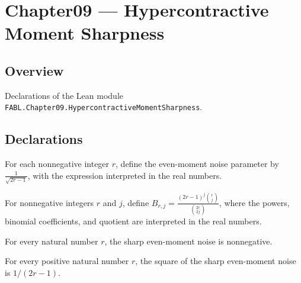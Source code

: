 \chapter{Chapter09 — Hypercontractive Moment Sharpness}
\section{Overview}

Declarations of the Lean module \texttt{FABL.Chapter09.HypercontractiveMomentSharpness}.

\section{Declarations}

\begin{definition}
\label{FABL.sharpEvenMomentNoise}
\leanok
For each nonnegative integer $r$, define the even-moment noise parameter by
$\displaystyle \frac{1}{\sqrt{2r-1}}$, with the expression interpreted in the real
numbers.
\end{definition}

\begin{definition}
\label{FABL.sharpEvenMomentBound}
\leanok
For nonnegative integers $r$ and $j$, define $\displaystyle
B_{r,j}=\frac{(2r-1)^j\binom{r}{j}}{\binom{2r}{2j}}$, where the powers, binomial
coefficients, and quotient are interpreted in the real numbers.
\end{definition}

\begin{theorem}
\label{FABL.sharpEvenMomentNoise_nonneg}
\leanok
{}
For every natural number $r$, the sharp even-moment noise is nonnegative.
\end{theorem}

\begin{theorem}
\label{FABL.sharpEvenMomentNoise_sq}
\leanok
{}
For every positive natural number $r$, the square of the sharp even-moment noise is
$1/(2r-1)$.
\end{theorem}

